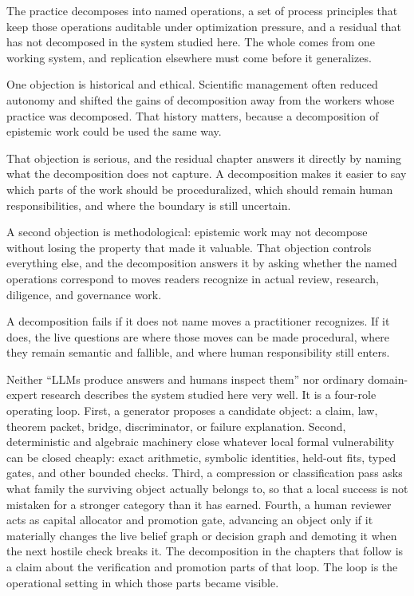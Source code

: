 \documentclass[
  11pt,
]{article}
\begin{document}
The practice decomposes into named operations, a set of process principles
that keep those operations auditable under optimization pressure, and a
residual that has not decomposed in the system studied here. The whole
comes from one working system, and replication elsewhere must come before
it generalizes.

One objection is historical and ethical. Scientific management often
reduced autonomy and shifted the gains of decomposition away from the
workers whose practice was decomposed. That history matters, because a
decomposition of epistemic work could be used the same way.

That objection is serious, and the residual chapter answers it directly
by naming what the decomposition does not capture. A decomposition makes
it easier to say which parts of the work should be proceduralized, which
should remain human responsibilities, and
where the boundary is still uncertain.

A second objection is methodological: epistemic work may not decompose
without losing the property that made it valuable. That objection
controls everything else, and the decomposition answers it by asking
whether the named operations correspond to moves readers recognize in
actual review, research, diligence, and governance work.

A decomposition fails if it does not name moves a practitioner
recognizes. If it does, the live questions are where those moves can be
made procedural, where they remain semantic and fallible, and where human
responsibility still enters.

Neither ``LLMs produce
answers and humans inspect them'' nor ordinary domain-expert research
describes the system studied here very well. It is a four-role operating
loop. First, a generator proposes a candidate object: a claim, law,
theorem packet, bridge, discriminator, or failure explanation. Second,
deterministic and algebraic machinery close whatever local formal
vulnerability can be closed cheaply: exact arithmetic, symbolic
identities, held-out fits, typed gates, and other bounded checks. Third,
a compression or classification pass asks what family the surviving
object actually belongs to, so that a local success is not mistaken for a
stronger category than it has earned. Fourth, a human reviewer acts as
capital allocator and promotion gate, advancing an object only if it
materially changes the live belief graph or decision graph and demoting
it when the next hostile check breaks it. The decomposition in the
chapters that follow is a claim about the verification and promotion
parts of that loop. The loop is the operational setting in which those
parts became visible.
\end{document}
